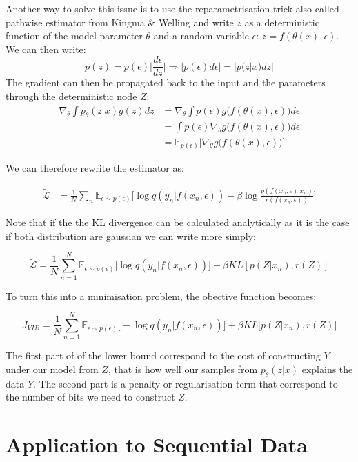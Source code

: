 \documentclass[11pt,oneside,openright]{report}
\begin{document}
Another way to solve this issue is to use the reparametrisation trick also called pathwise estimator  from Kingma \& Welling \cite{kingma} and write $z$ as a deterministic function of the model parameter $\theta$ and a random variable $\epsilon$: $z = f(\theta(x), \epsilon)$. We can then write:
$$p(z) = p(\epsilon) \Big|\frac{d\epsilon}{dz} \Big| \Rightarrow |p(\epsilon) d\epsilon| = |p(z|x) dz|$$
The gradient can then be propagated back to the input and the parameters through the deterministic node $Z$:
\begin{align}
\nabla_\theta \int p_\theta(z|x) g(z) dz &= \nabla_\theta \int p(\epsilon) g\big(f(\theta(x), \epsilon)\big) d\epsilon\\
&= \int p(\epsilon) \nabla_\theta g\big(f(\theta(x), \epsilon)\big) d\epsilon\\
&= \mathbb{E}_{p(\epsilon)}\Big[\nabla_\theta g\big(f(\theta(x), \epsilon)\big)\Big]
\end{align}

We can therefore rewrite the estimator as:

 \begin{align}
\tilde{\mathcal{L}}   &= \frac{1}{N}\sum_n  \mathbb{E}_{\epsilon \sim p(\epsilon)}\Big[  \log q(y_n|f(x_n, \epsilon)) - \beta  \log \frac{p(f(x_n, \epsilon)|x_n)}{r(f(x_n, \epsilon))}\Big]  \label{eq:lower2}
\end{align}

Note that if the the KL divergence can be calculated analytically as it is the case if both distribution are gaussian we can write more simply:

 $$ \tilde{\mathcal{L}}  = \frac{1}{N}  \sum_{n=1}^{N} \mathbb{E}_{\epsilon \sim p(\epsilon)}\Big[\log q(y_{n} |f(x_{n}, \epsilon))\Big] - \beta KL[p(Z|x_{n}), r(Z)]$$

To turn this into a minimisation problem, the obective function becomes:

 $$ J_{VIB} = \frac{1}{N}  \sum_{n=1}^{N} \mathbb{E}_{\epsilon \sim p(\epsilon)}\Big[-\log q(y_{n} |f(x_{n}, \epsilon))\Big] + \beta KL\big[p(Z|x_{n}), r(Z)\big]$$


The first part of of the lower bound correspond to the cost of constructing $Y$ under our model from $Z$, that is how well our samples from $p_\theta(z|x)$ explains the data $Y$. The second part is a penalty or regularisation term that correspond to the number of bits we need to construct $Z$.

\section{Application to Sequential Data}
\end{document}
